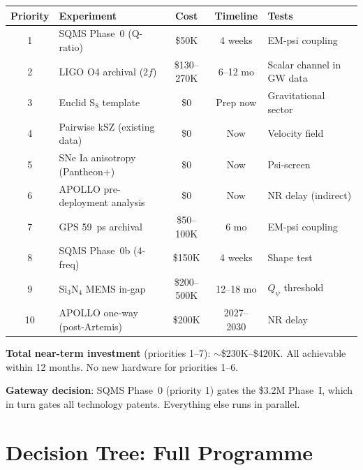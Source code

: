 \documentclass[11pt]{article}
\begin{document}
\begin{center}
\renewcommand{\arraystretch}{1.4}
\begin{tabular}{@{}clccl@{}}
\toprule
\textbf{Priority} & \textbf{Experiment} & \textbf{Cost} &
\textbf{Timeline} & \textbf{Tests} \\
\midrule
1 & SQMS Phase~0 (Q-ratio) & \$50K & 4 weeks & EM-psi coupling \\
2 & LIGO O4 archival ($2f$) & \$130--270K & 6--12 mo &
  Scalar channel in GW data \\
3 & Euclid S$_8$ template & \$0 & Prep now & Gravitational sector \\
4 & Pairwise kSZ (existing data) & \$0 & Now & Velocity field \\
5 & SNe Ia anisotropy (Pantheon+) & \$0 & Now & Psi-screen \\
6 & APOLLO pre-deployment analysis & \$0 & Now & NR delay (indirect) \\
7 & GPS 59~ps archival & \$50--100K & 6 mo & EM-psi coupling \\
8 & SQMS Phase~0b (4-freq) & \$150K & 4 weeks & Shape test \\
9 & Si$_3$N$_4$ MEMS in-gap & \$200--500K & 12--18 mo & $Q_\psi$ threshold \\
10 & APOLLO one-way (post-Artemis) & \$200K & 2027--2030 & NR delay \\
\bottomrule
\end{tabular}
\end{center}

\textbf{Total near-term investment} (priorities 1--7):
$\sim$\$230K--\$420K. All achievable within 12 months. No new
hardware for priorities 1--6.

\textbf{Gateway decision}: SQMS Phase~0 (priority 1) gates the
\$3.2M Phase~I, which in turn gates all technology patents.
Everything else runs in parallel.


\section{Decision Tree: Full Programme}
\label{sec:full-tree}
\end{document}

